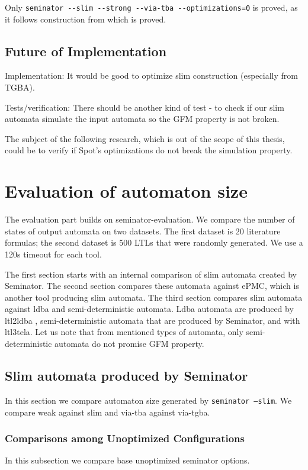 \documentclass[
	digital,
nolof, nolot
]{fithesis3}
\begin{document}
	Only \texttt{seminator -{}-slim -{}-strong -{}-via-tba -{}-optimizations=0} is proved, as it follows construction from \cite{hlavni} which is proved.
	
	\section{Future of Implementation}
	Implementation:
	It would be good to optimize slim construction (especially from TGBA).
	
	
	
	Tests/verification:
	There should be another kind of test - to check if our slim automata simulate the input automata so the GFM property is not broken.
	
	The subject of the following research, which is out of the scope of this thesis, could be to verify if Spot's optimizations do not break the simulation property. 
	
	\chapter{Evaluation of automaton size}
	The evaluation part builds on seminator-evaluation. We compare the number of states of output automata on two datasets. The first dataset is 20 literature formulas; the second dataset is 500 LTLs that were randomly generated. We use a 120s timeout for each tool.
	
	The first section starts with an internal comparison of slim automata created by Seminator. The second section compares these automata against ePMC\cite{epmc}, which is another tool producing slim automata. The third section compares slim automata against ldba and semi-deterministic automata. Ldba automata are produced by ltl2ldba \cite{ltl2ldba}, semi-deterministic automata that are produced by Seminator, and with ltl3tela\cite{ltl3tela}. Let us note that from mentioned types of automata, only semi-deterministic automata do not promise GFM property.
	
	\section{Slim automata produced by Seminator}
	In this section we compare automaton size generated by \texttt{seminator --slim}.
	We compare weak against slim and via-tba against via-tgba.
	\subsection{Comparisons among Unoptimized Configurations}
	In this subsection we compare base unoptimized seminator options.
	
\end{document}

